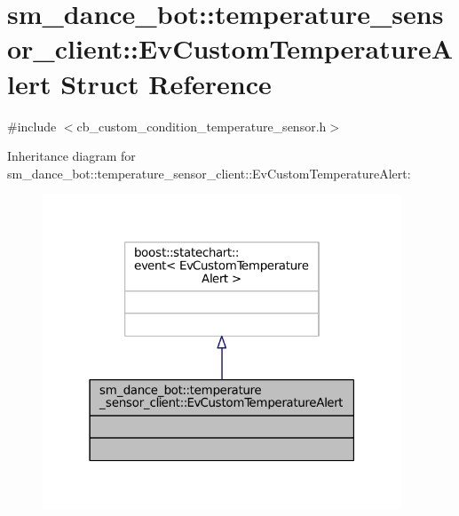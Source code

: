 \hypertarget{structsm__dance__bot_1_1temperature__sensor__client_1_1EvCustomTemperatureAlert}{}\section{sm\+\_\+dance\+\_\+bot\+:\+:temperature\+\_\+sensor\+\_\+client\+:\+:Ev\+Custom\+Temperature\+Alert Struct Reference}
\label{structsm__dance__bot_1_1temperature__sensor__client_1_1EvCustomTemperatureAlert}


{\ttfamily \#include $<$cb\+\_\+custom\+\_\+condition\+\_\+temperature\+\_\+sensor.\+h$>$}



Inheritance diagram for sm\+\_\+dance\+\_\+bot\+:\+:temperature\+\_\+sensor\+\_\+client\+:\+:Ev\+Custom\+Temperature\+Alert\+:
\nopagebreak
\begin{figure}[H]
\begin{center}
\leavevmode
\includegraphics[width=303pt]{structsm__dance__bot_1_1temperature__sensor__client_1_1EvCustomTemperatureAlert__inherit__graph}
\end{center}
\end{figure}


